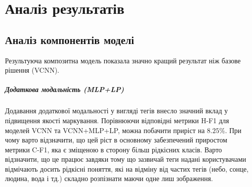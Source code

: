 \documentclass{udstu}
\begin{document}
\chapter{Аналіз результатів}

\section{Аналіз компонентів моделі}

\begin{center}
\end{center}

Результуюча композитна модель показала значно кращий результат ніж базове рішення (VCNN).

\paragraph{\textbf{Додаткова модальність (MLP+LP)}\\}

Додавання додаткової модальності у вигляді тегів внесло значний вклад
у підвищення якості маркування.
Порівнюючи відповідні метрики H-F1 для моделей VCNN та VCNN+MLP+LP, можна
побачити приріст на $8.25\%$. При чому варто відзначити, що цей ріст в основному
забезпечений приростом метрики C-F1, яка є зміщеною в сторону більш рідкісних класів.
Варто відзначити, що це працює завдяки тому що зазвичай теги надані користувачами відмічають
досить рідкісні поняття, які на відміну від частих тегів (небо, сонце, людина, вода і тд.) складно
розпізнати маючи одне лиш зображення.
\end{document}
